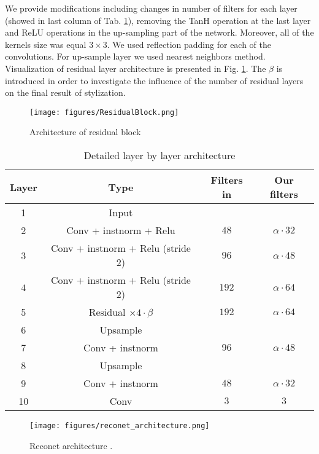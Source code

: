 \documentclass[a4paper,conference]{IEEEtran}
\newcommand{\ResidualLayerNumber}{\beta}
\begin{document}
We provide modifications including changes in number of filters for each layer (showed in last column of Tab. \ref{tableWithArchitecture}), removing the TanH operation at the last layer and ReLU operations in the up-sampling part of the network. Moreover, all of the kernels size was equal $3 \times 3$. We used reflection padding for each of the convolutions. For up-sample layer we used nearest neighbors method. Visualization of residual layer architecture is presented in Fig. \ref{residualBlockArchitecture}. The $\ResidualLayerNumber$ is introduced in order to investigate the influence of the number of residual layers on the final result of stylization. 


\begin{figure}[ht]
\caption{Architecture of residual block}
\label{residualBlockArchitecture}
\centering
\texttt{[image: figures/ResidualBlock.png]}
\end{figure}



\begin{table}[ht]
\scriptsize
\caption{Detailed layer by layer architecture}
\label{tableWithArchitecture}
\centering
\begin{tabular}{cccc}
\hline 
Layer & Type & Filters in \cite{Reconet} & Our filters \\ 
\hline 
1  & Input &  &  \\ 
\hline 
2 & Conv + instnorm + Relu & $ 48$  & $\alpha \cdot 32$ \\ 
\hline 
3 & Conv + instnorm + Relu (stride 2) & $96$ & $\alpha \cdot 48$ \\ 
\hline 
4& Conv + instnorm + Relu (stride 2) & $192$ & $\alpha \cdot 64$ \\ 
\hline 
5 & Residual  $\times  4 \cdot \ResidualLayerNumber$   & $192$ &  $\alpha \cdot 64$ \\ 
\hline
6 & Upsample & &\\
\hline 
7 & Conv + instnorm & $96$ & $\alpha \cdot 48$ \\ 
\hline 
8 & Upsample & &\\
\hline 
9 & Conv + instnorm & $48$ & $\alpha \cdot 32$ \\ 
\hline 
10 & Conv  & $3$ & $3$ \\ 
\hline 
\end{tabular} 
\end{table}


\begin{figure*}[ht]
\caption{Reconet architecture \cite{Reconet}.}
\label{networkArchitecture}
\centering
\texttt{[image: figures/reconet\_architecture.png]}
\end{figure*}
\end{document}
